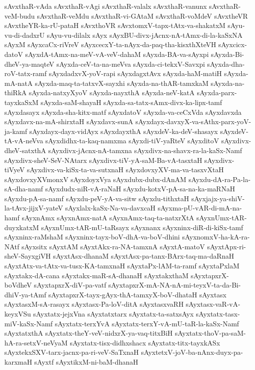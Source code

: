 {sAvxthaR-vAda
sAvxthaR-vAgi
sAvxthaR-valalx
sAvxthaR-vanunx
sAvxthaR-veM-budu
sAvxthaR-veMdu
sAvxthaR-vi-GAtaM
sAvxthaR-voMdeV
sAvxtheVR
sAvxtheYR-ka-rU-pataH
sAvxthoVR
sAvxtomxV-tapx-tAtx-va-shakatxM
sAyu-vu-di-dadxrU
sAyu-vu-dilalx
sAyx
sAyxBU-divx-jAcnx-nA-tAmx-di-la-kaSxNA
sAyxM
sAyxcaCx-riVreV
sAyxcecxY-ta-nAyx-da-paq-tha-kisxthXteVH
sAyxcicx-datoV
sAyxdA-tAmx-na-meV-vA-veV-dahaM
sAyxda-BA-va-sAyxpi
sAyxda-Bi-dheV-ya-maqteV
sAyxda-ceV-ta-na-meVva
sAyxda-ci-tekxV-Savxpi
sAyxda-dha-roV-tatx-ramf
sAyxdadxvX-yoV-rapi
sAyxdagxtAvx
sAyxda-haM-matiH
sAyxda-mA-natA
sAyxda-maq-ta-tatxvX-sayxhi
sAyxda-na-thAR-tamxkaM
sAyxda-na-thiRkA
sAyxda-natxyXyoV
sAyxda-nayxthA
sAyxda-neV-katA
sAyxda-parx-tayxkaSxM
sAyxda-saM-shayaH
sAyxda-sa-tatx-sAmx-divx-ka-lipx-tamf
sAyxdasayx
sAyxda-sha-kitx-matf
sAyxdatoV
sAyxda-va-ceCxVda
sAyxdavxda
sAyxdavx-na-mA-shirxtaH
sAyxdavx-sunA
sAyxdayx-davxyX-va-sAthx-parx-yoV-ja-kamf
sAyxdayx-dayx-vidAyx
sAyxdayxthA
sAyxdeV-ka-deV-shasayx
sAyxdeV-tA-vA-neVva
sAyxdidhx-ta-kaq-namxma
sAyxdi-tiV-yaRteV
sAyxditoV
sAyxdivx-dheV-satxthA
sAyxdivx-jAcnx-nA-tamxna
sAyxdivx-na-shavx-ra-la-kaSx-Namf
sAyxdivx-sheV-SeV-NAtarx
sAyxdivx-tiV-yA-saM-Ba-vA-tasxtaH
sAyxdivx-tiVyeV
sAyxdivx-va-kiSx-ta-va-sutxnaH
sAyxdovxyXV-ma-va-tasxvXtaH
sAyxdovxyXVmonxV
sAyxdoyxVya
sAyxdubx-dubx-dAnAM
sAyxdu-dA-ra-Pa-la-sA-dha-namf
sAyxdudx-niR-vA-raNaH
sAyxdu-kotxV-pA-sa-na-ka-maRNaH
sAyxdu-pA-sa-namf
sAyxdu-peV-yA-va-sitw
sAyxdu-tithxtaH
sAyxjajx-ya-shiV-la-tAvx-jijxV-yateV
sAyxlalx-kaSx-Na-va-davxcaH
sAyxma-pU-vAR-di-mA-na-hamf
sAyxnAmx
sAyxnAmx-natA
sAyxnAmx-taq-ta-natxrXtA
sAyxnUmx-tAR-duyxkatxM
sAyxnUmx-tAR-mU-taRsayx
sAyxnanx
sAyxninx-diR-di-kiSx-tamf
sAyxninx-raMshaM
sAyxninx-tayx-boV-dhA-va-boV-dhini
sAyxnomxV-ha-kA-ra-NAtf
sAyxsitx
sAyxtAM
sAyxtAkx-ra-NA-tamxnA
sAyxtA-matoV
sAyxtApx-ri-sheV-SayxgiVH
sAyxtAsx-dhanaM
sAyxtAsx-pa-tanx-BArx-taq-ma-daRnaH
sAyxtAtx-va-tAtx-va-tusx-KA-tamxnaH
sAyxtaPx-lAM-ta-ramf
sAyxtaPxlaM
sAyxtakx-dA-cana
sAyxtakx-maR-sA-dhanaH
sAyxtakxthaM
sAyxtapxrX-boVdheV
sAyxtapxrX-diV-pa-vatf
sAyxtapxrX-mA-NA-nA-mi-teyxV-ta-da-Bi-dhiV-ya-tAmf
sAyxtapxrX-tayx-gAyx-thA-tamxyX-boV-dhataH
sAyxtasx
sAyxtasxM-sA-rasayx
sAyxtasx-Pa-loV-ditA
sAyxtasxvaRH
sAyxtasx-vaR-vA-keyxVSu
sAyxtatx-jejxVna
sAyxtatxtarx
sAyxtatx-ta-satxsAyx
sAyxtatx-tasx-miV-kaSx-Namf
sAyxtatx-terxYvA
sAyxtatx-terxY-vA-mU-taR-la-kaSx-Namf
sAyxtatxthA
sAyxtatx-theY-veV-nidxrX-ya-vaq-titxBiH
sAyxtatx-thoV-pa-saM-hA-ra-setxV-neVyaM
sAyxtatx-tisx-didhxshacx
sAyxtatx-titx-tayxkASx
sAyxtekxSXV-tarx-jacnx-pa-ri-veV-SaTxnaH
sAyxtetxV-joV-ba-nAnx-duyx-pa-karxmaH
sAyxtf
sAyxtikxM-ni-baM-dhanaH
}
